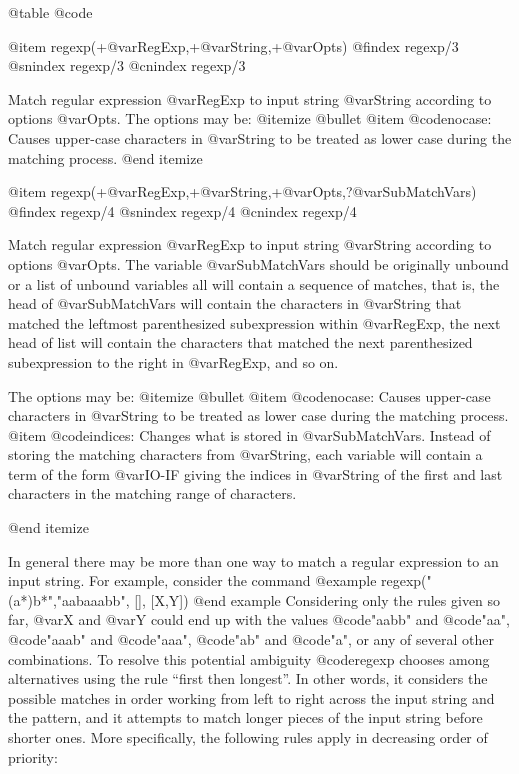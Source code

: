{{{{{{{{@table @code

@item regexp(+@var{RegExp},+@var{String},+@var{Opts})
@findex regexp/3
@snindex regexp/3
@cnindex regexp/3

Match regular expression @var{RegExp} to input string @var{String}
according to options @var{Opts}. The options may be:
@itemize @bullet
@item @code{nocase}: Causes upper-case characters  in  @var{String} to
        be treated  as  lower case during the matching process.
@end itemize

@item regexp(+@var{RegExp},+@var{String},+@var{Opts},?@var{SubMatchVars})
@findex regexp/4
@snindex regexp/4
@cnindex regexp/4

Match regular expression @var{RegExp} to input string @var{String}
according to options @var{Opts}. The variable @var{SubMatchVars} should
be originally unbound or a list of unbound variables all will contain a
sequence of matches, that is, the head of @var{SubMatchVars} will
contain the characters in @var{String} that matched the leftmost
parenthesized subexpression within @var{RegExp}, the next head of list
will contain the characters that matched the next parenthesized
subexpression to the right in @var{RegExp}, and so on.

The options may be:
@itemize @bullet
@item @code{nocase}: Causes upper-case characters  in  @var{String} to
        be treated  as  lower case during the matching process.
@item @code{indices}: Changes what  is  stored  in
@var{SubMatchVars}. Instead  of storing the matching characters from
@var{String}, each variable will contain a term of the form @var{IO-IF}
giving the indices in @var{String} of the first and last characters  in
the  matching range of characters.

@end itemize

In general there may be more than one way to match a regular expression
to an input string.  For example,  consider the command
@example
  regexp("(a*)b*","aabaaabb", [], [X,Y])
@end example
Considering only the rules given so far, @var{X} and @var{Y} could end up
with the values @code{"aabb"} and @code{"aa"}, @code{"aaab"} and
@code{"aaa"}, @code{"ab"} and @code{"a"}, or any of several other
combinations.  To resolve this potential ambiguity @code{regexp} chooses among
alternatives using the rule ``first then longest''.  In other words, it
considers the possible matches in order working from left to right
across the input string and the pattern, and it attempts to match longer
pieces of the input string before shorter ones.  More specifically, the
following rules apply in decreasing order of priority:


}}}}}}}}
